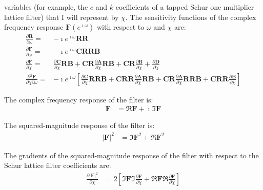 \documentclass[a4paper,twoside,10pt,english]{article}
\begin{document}
variables (for example, the $c$ and $k$ coefficients of a tapped Schur one
multiplier lattice filter) that I will represent by $\chi$. The sensitivity
functions of the complex frequency response
$\mathbf{F}\left(e^{\imath\omega}\right)$ with respect to $\omega$ and $\chi$ are:
\begin{align*}
  \frac{\partial\mathbf{R}}{\partial{}\omega}
  =& -\imath{}e^{\imath\omega}\mathbf{R}\mathbf{R}\\
\frac{\partial\mathbf{F}}{\partial\omega}=&
-\imath e^{\imath\omega}\mathbf{C}\mathbf{R}\mathbf{R}\mathbf{B} \\
  \frac{\partial\mathbf{F}}{\partial{}\chi}=
   &\frac{\partial\mathbf{C}}{\partial\chi}\mathbf{R}\mathbf{B}+
\mathbf{C}\mathbf{R}\frac{\partial\mathbf{A}}{\partial\chi}\mathbf{R}\mathbf{B}+
\mathbf{C}\mathbf{R}\frac{\partial\mathbf{B}}{\partial\chi}+
     \frac{\partial\mathbf{D}}{\partial\chi}\\
\frac{\partial{}^{2}\mathbf{F}}{\partial\chi\partial\omega}=&
-\imath{}e^{\imath\omega}\left[
\frac{\partial\mathbf{C}}{\partial\chi}\mathbf{R}\mathbf{R}\mathbf{B}+
\mathbf{C}\mathbf{R}\mathbf{R}\frac{\partial\mathbf{A}}{\partial\chi}\mathbf{R}\mathbf{B}+
\mathbf{C}\mathbf{R}\frac{\partial\mathbf{A}}{\partial\chi}\mathbf{R}\mathbf{R}\mathbf{B}+
\mathbf{C}\mathbf{R}\mathbf{R}\frac{\partial\mathbf{B}}{\partial\chi}\right]
\end{align*}

The complex frequency response of the filter is:
\begin{align*}
\mathbf{F} &=\Re\mathbf{F} + \imath\Im\mathbf{F}
\end{align*}

The squared-magnitude response of the filter is:
\begin{align*}
\left|\mathbf{F}\right|^{2} &=\Im \mathbf{F}^{2} + \Re \mathbf{F}^{2}
\end{align*}

The gradients of the squared-magnitude response of the filter with respect to 
the Schur lattice filter coefficients are:
\begin{align*}
\frac{\partial\left|\mathbf{F}\right|^{2}}{\partial\chi}
&= 2\left[\Im \mathbf{F}\Im\frac{\partial\mathbf{F}}{\partial\chi}+
          \Re \mathbf{F}\Re\frac{\partial\mathbf{F}}{\partial\chi}\right]
\end{align*}
\end{document}
